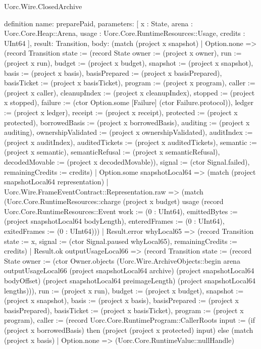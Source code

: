 \begin{lexlean}{Uorc.Wire.ClosedArchive}
\begin{semanticmodule}
definition{
  name: preparePaid,
  parameters: [
    x : State,
    arena : Uorc.Core.Heap::Arena,
    usage : Uorc.Core.RuntimeResources::Usage,
    credits : UInt64
  ],
  result: Transition,
  body: (match (project x snapshot)
    | Option.none => (record Transition {state := (record State {owner := (project x owner), run := (project x run), budget := (project x budget), snapshot := (project x snapshot), basis := (project x basis), basisPrepared := (project x basisPrepared), basisTicket := (project x basisTicket), program := (project x program), caller := (project x caller), cleanupIndex := (project x cleanupIndex), stopped := (project x stopped), failure := (ctor Option.some [Failure] (ctor Failure.protocol)), ledger := (project x ledger), receipt := (project x receipt), protected := (project x protected), borrowedBasis := (project x borrowedBasis), auditing := (project x auditing), ownershipValidated := (project x ownershipValidated), auditIndex := (project x auditIndex), auditedTickets := (project x auditedTickets), semantic := (project x semantic), semanticRefusal := (project x semanticRefusal), decodedMovable := (project x decodedMovable)}), signal := (ctor Signal.failed), remainingCredits := credits})
    | Option.some snapshotLocal64 => (match (project snapshotLocal64 representation)
      | Uorc.Wire.FrameEventContract::Representation.raw => (match (Uorc.Core.RuntimeResources::charge (project x budget) usage (record Uorc.Core.RuntimeResources::Event {work := (0 : UInt64), emittedBytes := (project snapshotLocal64 bodyLength), enteredFrames := (0 : UInt64), exitedFrames := (0 : UInt64)}))
        | Result.error whyLocal65 => (record Transition {state := x, signal := (ctor Signal.paused whyLocal65), remainingCredits := credits})
        | Result.ok outputUsageLocal66 => (record Transition {state := (record State {owner := (ctor Owner.objects (Uorc.Wire.ArchiveObjects::begin arena outputUsageLocal66 (project snapshotLocal64 archive) (project snapshotLocal64 bodyOffset) (project snapshotLocal64 preimageLength) (project snapshotLocal64 lengths))), run := (project x run), budget := (project x budget), snapshot := (project x snapshot), basis := (project x basis), basisPrepared := (project x basisPrepared), basisTicket := (project x basisTicket), program := (project x program), caller := (record Uorc.Core.RuntimeProgram::CallerRoots {input := (if (project x borrowedBasis) then (project (project x protected) input) else (match (project x basis)
          | Option.none => (Uorc.Core.RuntimeValue::nullHandle)
}}}}
\end{semanticmodule}
\end{lexlean}
